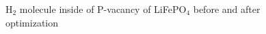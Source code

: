 \documentclass[11pt]{article}
\begin{document}
\begin{figure}[H]
\begin{minipage}[h]{0.48\linewidth}
\end{minipage}
\hfill
\begin{minipage}[h]{0.48\linewidth}
\end{minipage}
\caption{H$_2$ molecule inside of P-vacancy of LiFePO$_4$ before and after optimization}
\label{h2}
\end{figure}
\end{document}

